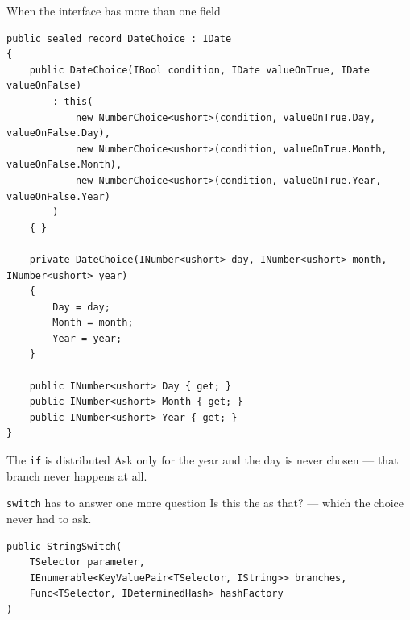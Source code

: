 \documentclass[aspectratio=169,10pt,t]{beamer}
\begin{document}
\begin{frame}[fragile]{When the interface has more than one field}
  \vspace{0.1em}
\begin{lstlisting}[basicstyle=\ttfamily\tiny]
public sealed record DateChoice : IDate
{
    public DateChoice(IBool condition, IDate valueOnTrue, IDate valueOnFalse)
        : this(
            new NumberChoice<ushort>(condition, valueOnTrue.Day, valueOnFalse.Day),
            new NumberChoice<ushort>(condition, valueOnTrue.Month, valueOnFalse.Month),
            new NumberChoice<ushort>(condition, valueOnTrue.Year, valueOnFalse.Year)
        )
    { }

    private DateChoice(INumber<ushort> day, INumber<ushort> month, INumber<ushort> year)
    {
        Day = day;
        Month = month;
        Year = year;
    }

    public INumber<ushort> Day { get; }
    public INumber<ushort> Month { get; }
    public INumber<ushort> Year { get; }
}
\end{lstlisting}
  \vspace{0.3em}
\end{frame}

\begin{frame}{The \texttt{if} is distributed}
  \slidetop
  Ask only for the year and the day is never chosen --- that branch never
  happens at all.

  \slidegap
\end{frame}

\begin{frame}[fragile]{\texttt{switch} has to answer one more question}
  \vspace{0.8em}
  Is this the  as that? --- which the choice never had to ask.
  \vspace{1.0em}
\begin{lstlisting}
public StringSwitch(
    TSelector parameter,
    IEnumerable<KeyValuePair<TSelector, IString>> branches,
    Func<TSelector, IDeterminedHash> hashFactory
)
\end{lstlisting}
  \vspace{1.0em}
\end{frame}
\end{document}
